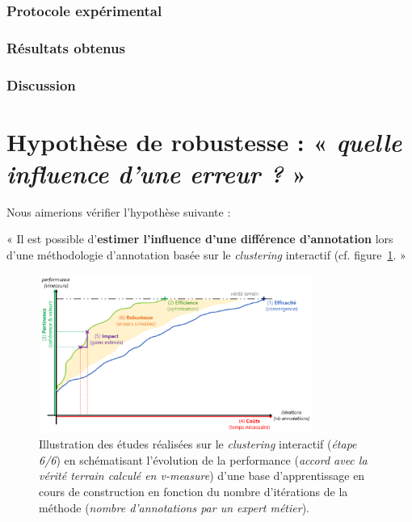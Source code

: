 			\subsubsection{Protocole expérimental}

			\subsubsection{Résultats obtenus}

			\subsubsection{Discussion}
	

    \section{Hypothèse de robustesse : « \textit{quelle influence d'une erreur ?} »}
	\label{section:4.6-HYPOTHESE-ROBUSTESSE}
	
		Nous aimerions vérifier l'hypothèse suivante :

		\begin{tcolorbox}[
			title=\textbf{Hypothèse de robustesse},
			colback=gray!20,
			colframe=gray!50!black!75,
			width=\linewidth
		]
			« Il est possible d'\textbf{estimer l'influence d'une différence d'annotation} lors d'une méthodologie d'annotation basée sur le \textit{clustering} interactif (cf. figure~\ref{figure:HYPOTHESE-ROBUSTESSE}. »
			
			
			\begin{figure}[H]
				\centering
				\includegraphics[width=0.8\textwidth]{figures/hypotheses-06-robustesse}
				\caption{Illustration des études réalisées sur le \textit{clustering} interactif (\textit{étape 6/6}) en schématisant l'évolution de la performance (\textit{accord avec la vérité terrain calculé en v-measure}) d'une base d'apprentissage en cours de construction en fonction du nombre d'itérations de la méthode (\textit{nombre d'annotations par un expert métier}).}
				\label{figure:HYPOTHESE-ROBUSTESSE}
			\end{figure}

		\end{tcolorbox}
		
